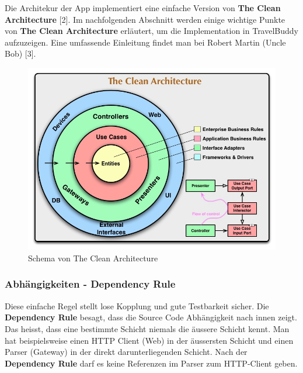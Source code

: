 \documentclass[a4paper,10pt,xetex]{article}
\begin{document}
Die Architekur der App implementiert eine einfache Version von \textbf{The Clean Architecture} [2].
Im nachfolgenden Abschnitt werden einige wichtige Punkte von \textbf{The Clean Architecture}
erläutert, um die Implementation in TravelBuddy aufzuzeigen. Eine umfassende
Einleitung findet man bei Robert Martin (Uncle Bob) [3].
\begin{figure}
  \includegraphics{cleanarchitecture}
  \caption{Schema von The Clean Architecture}
\end{figure}

\subsubsection{Abhängigkeiten - Dependency Rule}\label{dependencyrule}
Diese einfache Regel stellt lose Kopplung und gute Testbarkeit sicher.
Die \textbf{Dependency Rule} besagt, dass die Source Code Abhängigkeit nach innen zeigt.
Das heisst, dass eine bestimmte Schicht niemals die äussere Schicht kennt.
Man hat beispielsweise einen HTTP Client (Web) in der äussersten Schicht und
einen Parser (Gateway) in der direkt darunterliegenden Schicht. Nach der
\textbf{Dependency Rule} darf es keine Referenzen im Parser zum HTTP-Client geben.
\end{document}
